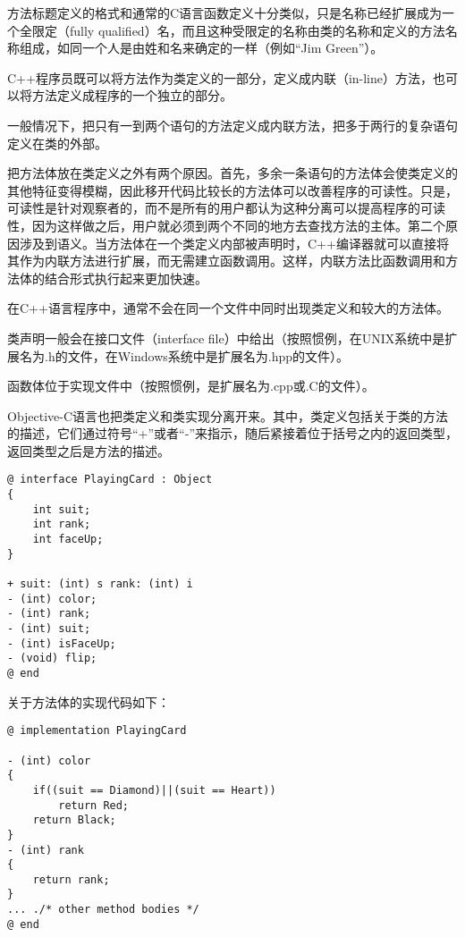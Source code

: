 方法标题定义的格式和通常的C语言函数定义十分类似，只是名称已经扩展成为一个全限定（fully qualified）名，而且这种受限定的名称由类的名称和定义的方法名称组成，如同一个人是由姓和名来确定的一样（例如“Jim Green”）。

C++程序员既可以将方法作为类定义的一部分，定义成内联（in-line）方法，也可以将方法定义成程序的一个独立的部分。

一般情况下，把只有一到两个语句的方法定义成内联方法，把多于两行的复杂语句定义在类的外部。



把方法体放在类定义之外有两个原因。首先，多余一条语句的方法体会使类定义的其他特征变得模糊，因此移开代码比较长的方法体可以改善程序的可读性。只是，可读性是针对观察者的，而不是所有的用户都认为这种分离可以提高程序的可读性，因为这样做之后，用户就必须到两个不同的地方去查找方法的主体。第二个原因涉及到语义。当方法体在一个类定义内部被声明时，C++编译器就可以直接将其作为内联方法进行扩展，而无需建立函数调用。这样，内联方法比函数调用和方法体的结合形式执行起来更加快速。


在C++语言程序中，通常不会在同一个文件中同时出现类定义和较大的方法体。

\begin{compactitem}
\item 类声明一般会在接口文件（interface file）中给出（按照惯例，在UNIX系统中是扩展名为.h的文件，在Windows系统中是扩展名为.hpp的文件）。
\item 函数体位于实现文件中（按照惯例，是扩展名为.cpp或.C的文件）。
\end{compactitem}

Objective-C语言也把类定义和类实现分离开来。其中，类定义包括关于类的方法的描述，它们通过符号“+”或者“-”来指示，随后紧接着位于括号之内的返回类型，返回类型之后是方法的描述。

\begin{lstlisting}[language={[Objective]C}]
@ interface PlayingCard : Object
{
	int suit;
	int rank;
	int faceUp;
}
	
+ suit: (int) s rank: (int) i
- (int) color;
- (int) rank;
- (int) suit;
- (int) isFaceUp;
- (void) flip;
@ end
\end{lstlisting}


关于方法体的实现代码如下：



\begin{lstlisting}[language={[Objective]C}]
@ implementation PlayingCard
	
- (int) color
{
	if((suit == Diamond)||(suit == Heart))
		return Red;
	return Black;
}
- (int) rank
{
	return rank;
}
... ./* other method bodies */
@ end
\end{lstlisting}



